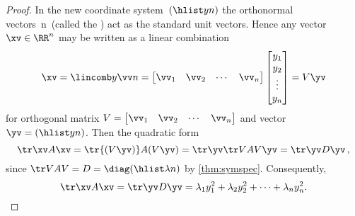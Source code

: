 \begin{proof} 
In the new coordinate system~\((\hlist yn)\) the orthonormal vectors~\hlist\vv n\ (called the ) act as the standard unit vectors.
Hence any vector \(\xv\in\RR^n\) may be written as a linear combination
\begin{equation*}
\xv=\lincomb y\vv n
=\begin{bmatrix} \vv_1&\vv_2&\cdots&\vv_n \end{bmatrix}\begin{bmatrix} y_1\\y_2\\\vdots\\y_n \end{bmatrix}
=V\yv
\end{equation*}
for orthogonal matrix \(V=\begin{bmatrix} \vv_1&\vv_2&\cdots&\vv_n \end{bmatrix}\) and vector \(\yv=(\hlist yn)\).
Then the quadratic form 
\begin{equation*}
\tr\xv A\xv=\tr{(V\yv)} A(V\yv)=\tr\yv \tr VAV\yv=\tr\yv D\yv\,,
\end{equation*}
since \(\tr VAV=D=\diag(\hlist\lambda n)\) by \cref{thm:symspec}.
Consequently,
\begin{equation*}
\tr\xv A\xv=\tr\yv D\yv=\lambda_1y_1^2+\lambda_2y_2^2+\cdots+\lambda_ny_n^2.
\end{equation*}
\end{proof}



\begin{comment}
Maybe applications to moment of inertia? and the rotating lunch box?
extreme stresses in a solid?
Could link to SVD and extreme values of length \(|A\xv|\): but where is it best established?
\end{comment}





